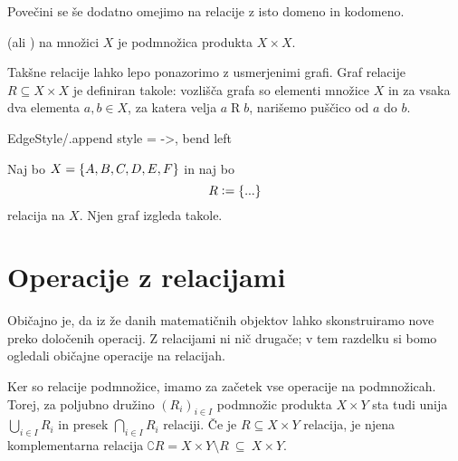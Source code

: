 		Povečini se še dodatno omejimo na relacije z isto domeno in kodomeno.
		\begin{definicija}
			 (ali )  na množici $X$ je podmnožica produkta $X \times X$.
		\end{definicija}
		
		Takšne relacije lahko lepo ponazorimo z usmerjenimi grafi. Graf relacije $R \subseteq X \times X$ je definiran takole: vozlišča grafa so elementi množice $X$ in za vsaka dva elementa $a, b \in X$, za katera velja $a \mathrel{R} b$, narišemo puščico od $a$ do $b$.
		
		\GraphInit[vstyle = Normal]
		\tikzset
		{
			EdgeStyle/.append style = {->, bend left}
		}
		
		\begin{zgled}\label{ZGLED: graf relacije}
			Naj bo $X = \set{A, B, C, D, E, F}$ in naj bo
			\[R \dfeq \set{...}\]
			relacija na $X$. Njen graf izgleda takole.
			
		\end{zgled}
	
	
	\section{Operacije z relacijami}\label{RAZDELEK: Operacije z relacijami}
	
		Običajno je, da iz že danih matematičnih objektov lahko skonstruiramo nove preko določenih operacij. Z relacijami ni nič drugače; v tem razdelku si bomo ogledali običajne operacije na relacijah.
		
		Ker so relacije podmnožice, imamo za začetek vse operacije na podmnožicah. Torej, za poljubno družino $(R_i)_{i \in I}$ podmnožic produkta $X \times Y$ sta tudi unija $\bigcup_{i \in I} R_i$ in presek $\bigcap_{i \in I} R_i$ relaciji. Če je $R \subseteq X \times Y$ relacija, je njena komplementarna relacija $\complement{R} = X \times Y \setminus R \ \subseteq \ X \times Y$.
		
